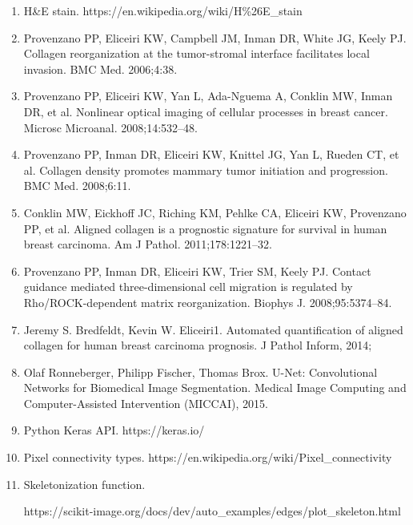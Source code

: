 \documentclass{article}
\begin{document}
\begin{enumerate}

\item H\&E stain. https://en.wikipedia.org/wiki/H\%26E\_stain

\item Provenzano PP, Eliceiri KW, Campbell JM, Inman DR, White JG, Keely PJ. Collagen reorganization at the tumor-stromal interface facilitates local invasion. BMC Med. 2006;4:38.

\item Provenzano PP, Eliceiri KW, Yan L, Ada-Nguema A, Conklin MW, Inman DR, et al. Nonlinear optical imaging of cellular processes in breast cancer. Microsc Microanal. 2008;14:532–48.

\item Provenzano PP, Inman DR, Eliceiri KW, Knittel JG, Yan L, Rueden CT, et al. Collagen density promotes mammary tumor initiation and progression. BMC Med. 2008;6:11.

\item Conklin MW, Eickhoff JC, Riching KM, Pehlke CA, Eliceiri KW, Provenzano PP, et al. Aligned collagen is a prognostic signature for survival in human breast carcinoma. Am J Pathol. 2011;178:1221–32.

\item Provenzano PP, Inman DR, Eliceiri KW, Trier SM, Keely PJ. Contact guidance mediated three-dimensional cell migration is regulated by Rho/ROCK-dependent matrix reorganization. Biophys J. 2008;95:5374–84.

\item Jeremy S. Bredfeldt, Kevin W. Eliceiri1. Automated quantification of aligned collagen for human breast carcinoma prognosis. J Pathol Inform, 2014;

\item Olaf Ronneberger, Philipp Fischer, Thomas Brox. U-Net: Convolutional Networks for Biomedical Image Segmentation. Medical Image Computing and Computer-Assisted Intervention (MICCAI), 2015.

\item Python Keras API. https://keras.io/

\item Pixel connectivity types. https://en.wikipedia.org/wiki/Pixel\_connectivity

\item Skeletonization function.
      
      https://scikit-image.org/docs/dev/auto\_examples/edges/plot\_skeleton.html


\end{enumerate}
\end{document}
